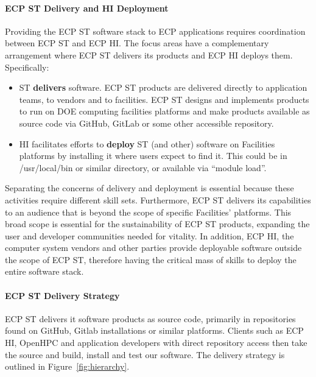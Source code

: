 \paragraph{ECP ST Delivery and HI Deployment}
Providing the ECP ST software stack to ECP applications requires coordination between ECP ST and ECP HI. The focus areas have a complementary arrangement where ECP ST delivers its products and ECP HI deploys them. Specifically:
\begin{itemize}
	\item ST \textbf{delivers} software.  ECP ST products are delivered directly to application teams, to vendors and to facilities.  ECP ST designs and implements products to run on DOE computing facilities platforms and make products available as source code via GitHub, GitLab or some other accessible repository.
	\item HI facilitates efforts to \textbf{deploy} ST (and other) software on Facilities platforms by installing it where users expect to find it. This could be in /usr/local/bin or similar directory, or available via “module load”.
\end{itemize}
Separating the concerns of delivery and deployment is essential because these activities require different skill sets. Furthermore, ECP ST delivers its capabilities to an audience that is beyond the scope of specific Facilities’ platforms. This broad scope is essential for the sustainability of ECP ST products, expanding the user and developer communities needed for vitality. In addition, ECP HI, the computer system vendors and other parties provide deployable software outside the scope of ECP ST, therefore having the critical mass of skills to deploy the entire software stack.

\paragraph{ECP ST Delivery Strategy}
ECP ST delivers it software products as source code, primarily in repositories found on GitHub, Gitlab installations or similar platforms. Clients such as ECP HI, OpenHPC and application developers with direct repository access then take the source and build, install and test our software. The delivery strategy is outlined in Figure~\ref{fig:hierarchy}.  

